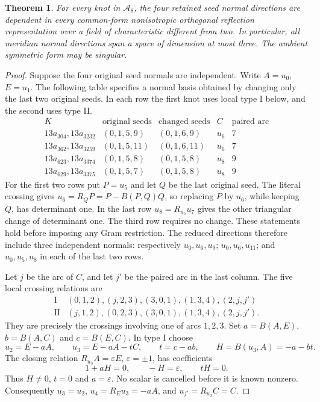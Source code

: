 \documentclass[11pt]{article}
\newtheorem{theorem}{Theorem}
\begin{document}
\begin{theorem}\label{thm:a6eight}
For every knot in $\mathcal A_8$, the four retained seed normal
directions are dependent in every common-form nonisotropic orthogonal
reflection representation over a field of characteristic different
from two. In particular, all meridian normal directions span a space
of dimension at most three. The ambient symmetric form may be singular.
\end{theorem}
\begin{proof}
Suppose the four original seed normals are independent. Write
$A=u_0$, $E=u_1$. The following table specifies a normal basis obtained
by changing only the last two original seeds. In each row the first
knot uses local type I below, and the second uses type II.
\[
\begin{array}{c|c|c|c|c}
 K&\text{original seeds}&\text{changed seeds}&C&\text{paired arc}\\\hline
13a_{304},13a_{3232}&(0,1,5,9)&(0,1,6,9)&u_6&7\\
13a_{362},13a_{3259}&(0,1,5,11)&(0,1,6,11)&u_6&7\\
13a_{623},13a_{3374}&(0,1,5,8)&(0,1,5,8)&u_8&9\\
13a_{629},13a_{3375}&(0,1,5,7)&(0,1,5,8)&u_8&9
\end{array}
\]
For the first two rows put $P=u_5$ and let $Q$ be the last
original seed. The literal crossing gives $u_6=R_QP=P-B(P,Q)Q$,
so replacing $P$ by $u_6$, while keeping $Q$, has determinant one.
In the last row $u_8=R_{u_5}u_7$ gives the other triangular change
of determinant one. The third row requires no change. These statements
hold before imposing any Gram restriction. The reduced directions
therefore include three independent normals: respectively
$u_0,u_6,u_9$; $u_0,u_6,u_{11}$; and $u_0,u_5,u_8$ in each
of the last two rows.

Let $j$ be the arc of $C$, and let $j'$ be the paired arc in the
last column. The five local crossing relations are
\[
\begin{array}{c|l}
\mathrm{I}&(0,1,2),(j,2,3),(3,0,1),(1,3,4),(2,j,j')\\
\mathrm{II}&(j,1,2),(0,2,3),(3,0,1),(1,3,4),(2,j,j').
\end{array}
\]
They are precisely the crossings involving one of arcs $1,2,3$.
Set $a=B(A,E)$, $b=B(A,C)$ and $c=B(E,C)$.
In type I choose
\[
 u_2=E-aA,\qquad u_3=E-aA-tC,\qquad t=c-ab,
 \qquad H=B(u_3,A)=-a-bt.
\]
The closing relation $R_{u_3}A=\varepsilon E$, $\varepsilon=\pm1$,
has coefficients
\[
                   1+aH=0,\qquad -H=\varepsilon,
                   \qquad tH=0.
\]
Thus $H\ne0$, $t=0$ and $a=\varepsilon$.
No scalar is cancelled before it is known nonzero.
Consequently $u_3=u_2$, $u_4=R_Eu_3=-aA$, and
$u_{j'}=R_{u_2}C=C$.


\end{proof}
\end{document}
